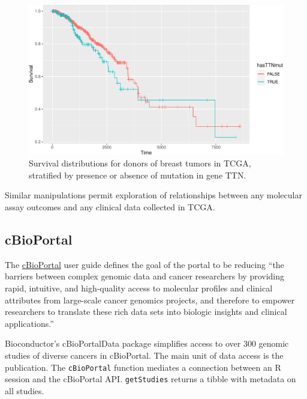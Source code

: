 \begin{figure}
\includegraphics[width=1\linewidth,]{bioccb_files/figure-latex/strat-1} \caption{Survival distributions for donors of breast tumors in TCGA, stratified by presence or absence of mutation in gene TTN.}\label{fig:strat}
\end{figure}

Similar manipulations permit exploration of relationships between
any molecular assay outcomes and any clinical data collected in TCGA.

\hypertarget{cbioportal}{%
\subsection{cBioPortal}\label{cbioportal}}

The \href{https://www.cbioportal.org/}{cBioPortal} user guide
defines the goal of the portal to be reducing ``the barriers between complex
genomic data and cancer researchers by providing rapid, intuitive, and high-quality
access to molecular profiles and clinical attributes from large-scale cancer genomics projects, and
therefore to empower researchers to translate these rich data sets into biologic insights and clinical applications.''

Bioconductor's cBioPortalData package simplifies access to over 300 genomic studies of
diverse cancers in cBioPortal. The main unit of data access is the publication. The
\texttt{cBioPortal} function mediates a connection between an R session and the
cBioPortal API. \texttt{getStudies} returns a tibble with metadata on
all studies.

\begin{Shaded}
\begin{Highlighting}[]
\StringTok{ }\NormalTok{()}
\StringTok{ }
\end{Highlighting}
\end{Shaded}


